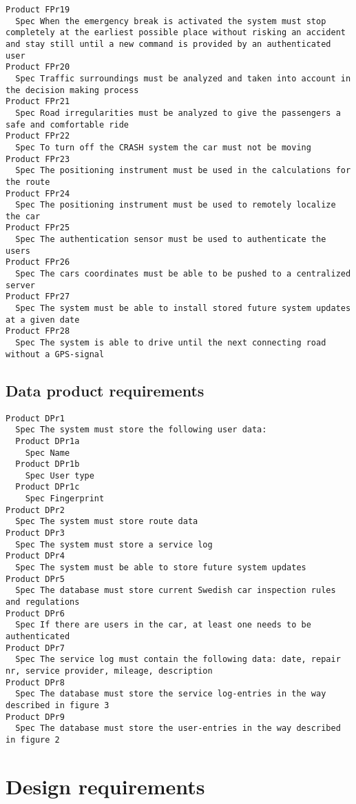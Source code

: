 \begin{lstlisting}
Product FPr19
  Spec When the emergency break is activated the system must stop completely at the earliest possible place without risking an accident and stay still until a new command is provided by an authenticated user
Product FPr20
  Spec Traffic surroundings must be analyzed and taken into account in the decision making process
Product FPr21
  Spec Road irregularities must be analyzed to give the passengers a safe and comfortable ride
Product FPr22
  Spec To turn off the CRASH system the car must not be moving
Product FPr23
  Spec The positioning instrument must be used in the calculations for the route
Product FPr24
  Spec The positioning instrument must be used to remotely localize the car
Product FPr25
  Spec The authentication sensor must be used to authenticate the users
Product FPr26
  Spec The cars coordinates must be able to be pushed to a centralized server
Product FPr27
  Spec The system must be able to install stored future system updates at a given date
Product FPr28
  Spec The system is able to drive until the next connecting road without a GPS-signal

\end{lstlisting}
    
        
       \subsection{Data product requirements}


\begin{lstlisting}
Product DPr1
  Spec The system must store the following user data:
  Product DPr1a
    Spec Name
  Product DPr1b
    Spec User type
  Product DPr1c
    Spec Fingerprint
Product DPr2
  Spec The system must store route data
Product DPr3
  Spec The system must store a service log
Product DPr4
  Spec The system must be able to store future system updates
Product DPr5
  Spec The database must store current Swedish car inspection rules and regulations
Product DPr6
  Spec If there are users in the car, at least one needs to be authenticated
Product DPr7
  Spec The service log must contain the following data: date, repair nr, service provider, mileage, description
Product DPr8
  Spec The database must store the service log-entries in the way described in figure 3
Product DPr9
  Spec The database must store the user-entries in the way described in figure 2

\end{lstlisting}
    
        
       \section{Design requirements}


